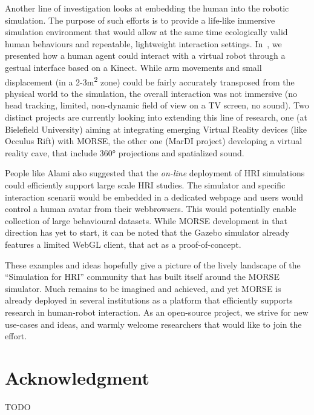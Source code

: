 \documentclass[conference]{IEEEtran}
\begin{document}
Another line of investigation looks at embedding the human into the robotic
simulation. The purpose of such efforts is to provide a life-like immersive
simulation environment that would allow at the same time ecologically valid
human behaviours and repeatable, lightweight interaction settings.
In~\cite{lemaignan2012morse}, we presented how a human agent could interact with
a virtual robot through a gestual interface based on a Kinect. While arm
movements and small displacement (in a 2-3m\textsuperscript{2} zone) could be fairly
accurately transposed from the physical world to the simulation, the overall
interaction was not immersive (no head tracking, limited, non-dynamic field of
view on a TV screen, no sound). Two distinct projects are currently looking into
extending this line of research, one (at Bielefield University) aiming at
integrating emerging Virtual Reality devices (like Occulus Rift) with MORSE, the
other one (MarDI project) developing a virtual reality cave, that include 360°
projections and spatialized sound.

People like Alami also suggested that the \emph{on-line} deployment of HRI
simulations could efficiently support large scale HRI studies. The simulator and
specific interaction scenarii would be embedded in a dedicated webpage and users
would control a human avatar from their webbrowsers. This would potentially
enable collection of large behavioural datasets. While MORSE development in
that direction has yet to start, it can be noted that the Gazebo simulator
already features a limited WebGL client, that act as a proof-of-concept.

These examples and ideas hopefully give a picture of the lively landscape of the
``Simulation for HRI'' community that has built itself around the MORSE
simulator. Much remains to be imagined and achieved, and yet MORSE is already
deployed in several institutions as a platform that efficiently supports
research in human-robot interaction. As an open-source project, we strive for
new use-cases and ideas, and warmly welcome researchers that would like to join
the effort.

\section*{Acknowledgment}
TODO



\end{document}
